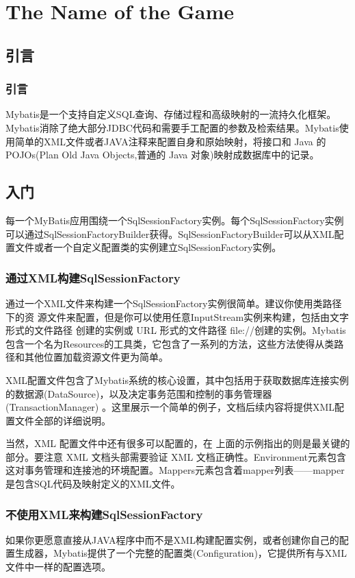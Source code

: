 
\chapter{The Name of the Game}
\section{引言}
\subsection{引言}
Mybatis是一个支持自定义SQL查询、存储过程和高级映射的一流持久化框架。Mybatis消除了绝大部分JDBC代码和需要手工配置的参数及检索结果。Mybatis使用简单的XML文件或者JAVA注释来配置自身和原始映射，将接口和 Java 的 POJOs(Plan Old Java Objects,普通的 Java 对象)映射成数据库中的记录。
\section{入门}
每一个MyBatis应用围绕一个SqlSessionFactory实例。每个SqlSessionFactory实例可以通过SqlSessionFactoryBuilder获得。SqlSessionFactoryBuilder可以从XML配置文件或者一个自定义配置类的实例建立SqlSessionFactory实例。
\subsection{通过XML构建SqlSessionFactory}
通过一个XML文件来构建一个SqlSessionFactory实例很简单。建议你使用类路径下的资 源文件来配置，但是你可以使用任意InputStream实例来构建，包括由文字形式的文件路径 创建的实例或 URL 形式的文件路径 file://创建的实例。Mybatis包含一个名为Resources的工具类，它包含了一系列的方法，这些方法使得从类路径和其他位置加载资源文件更为简单。



XML配置文件包含了Mybatis系统的核心设置，其中包括用于获取数据库连接实例的数据源(DataSource)，以及决定事务范围和控制的事务管理器(TransactionManager) 。这里展示一个简单的例子，文档后续内容将提供XML配置文件全部的详细说明。



当然，XML 配置文件中还有很多可以配置的，在 上面的示例指出的则是最关键的部分。要注意 XML 文档头部需要验证 XML 文档正确性。Environment元素包含这对事务管理和连接池的环境配置。Mappers元素包含着mapper列表——mapper是包含SQL代码及映射定义的XML文件。
\subsection{不使用XML来构建SqlSessionFactory}
如果你更愿意直接从JAVA程序中而不是XML构建配置实例，或者创建你自己的配置生成器，Mybatis提供了一个完整的配置类(Configuration)，它提供所有与XML 文件中一样的配置选项。

